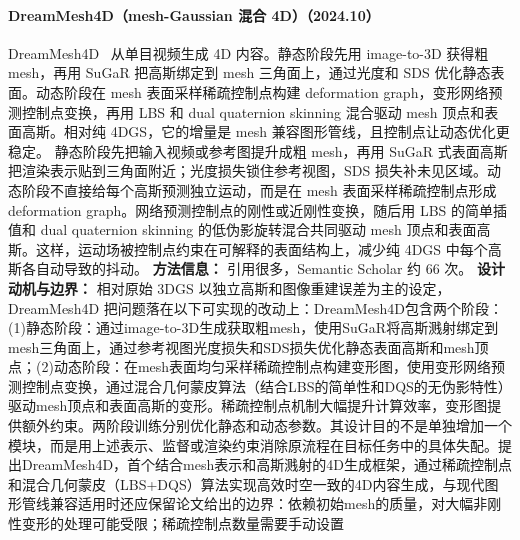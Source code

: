 \paragraph{DreamMesh4D（mesh-Gaussian 混合 4D）（2024.10）}
DreamMesh4D~\cite{2410_06756} 从单目视频生成 4D 内容。静态阶段先用 image-to-3D 获得粗 mesh，再用 SuGaR 把高斯绑定到 mesh 三角面上，通过光度和 SDS 优化静态表面。动态阶段在 mesh 表面采样稀疏控制点构建 deformation graph，变形网络预测控制点变换，再用 LBS 和 dual quaternion skinning 混合驱动 mesh 顶点和表面高斯。相对纯 4DGS，它的增量是 mesh 兼容图形管线，且控制点让动态优化更稳定。
静态阶段先把输入视频或参考图提升成粗 mesh，再用 SuGaR 式表面高斯把渲染表示贴到三角面附近；光度损失锁住参考视图，SDS 损失补未见区域。动态阶段不直接给每个高斯预测独立运动，而是在 mesh 表面采样稀疏控制点形成 deformation graph。网络预测控制点的刚性或近刚性变换，随后用 LBS 的简单插值和 dual quaternion skinning 的低伪影旋转混合共同驱动 mesh 顶点和表面高斯。这样，运动场被控制点约束在可解释的表面结构上，减少纯 4DGS 中每个高斯各自动导致的抖动。
\textbf{方法信息：} 引用很多，Semantic Scholar 约 66 次。
\textbf{设计动机与边界：} 相对原始 3DGS 以独立高斯和图像重建误差为主的设定，DreamMesh4D 把问题落在以下可实现的改动上：DreamMesh4D包含两个阶段：(1)静态阶段：通过image-to-3D生成获取粗mesh，使用SuGaR将高斯溅射绑定到mesh三角面上，通过参考视图光度损失和SDS损失优化静态表面高斯和mesh顶点；(2)动态阶段：在mesh表面均匀采样稀疏控制点构建变形图，使用变形网络预测控制点变换，通过混合几何蒙皮算法（结合LBS的简单性和DQS的无伪影特性）驱动mesh顶点和表面高斯的变形。稀疏控制点机制大幅提升计算效率，变形图提供额外约束。两阶段训练分别优化静态和动态参数。其设计目的不是单独增加一个模块，而是用上述表示、监督或渲染约束消除原流程在目标任务中的具体失配。提出DreamMesh4D，首个结合mesh表示和高斯溅射的4D生成框架，通过稀疏控制点和混合几何蒙皮（LBS+DQS）算法实现高效时空一致的4D内容生成，与现代图形管线兼容适用时还应保留论文给出的边界：依赖初始mesh的质量，对大幅非刚性变形的处理可能受限；稀疏控制点数量需要手动设置

